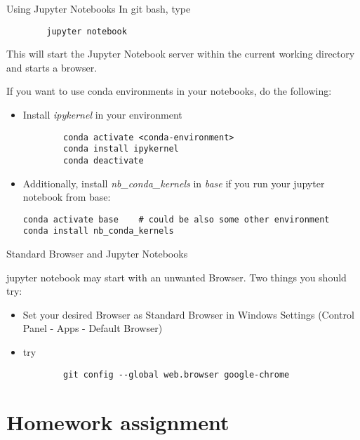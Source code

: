 \begin{frame}[fragile]{Using Jupyter Notebooks}
		In git bash, type
		\begin{verbatim}
		jupyter notebook
		\end{verbatim}
		This will start the Jupyter Notebook server within the current working directory and starts a browser.
		
		If you want to use conda environments in your notebooks, do the following:
		\begin{itemize}
			\item Install \textit{ipykernel} in your environment
		
		\begin{verbatim}
		conda activate <conda-environment>
		conda install ipykernel
		conda deactivate
		\end{verbatim}
		\item Additionally, install \textit{nb\_conda\_kernels} in \textit{base} if you run your jupyter notebook from base:
		\begin{verbatim}
conda activate base    # could be also some other environment
conda install nb_conda_kernels
		 \end{verbatim}
		\end{itemize}
		
\end{frame}

\begin{frame}[fragile]{Standard Browser and Jupyter Notebooks}
	
	jupyter notebook may start with an unwanted Browser. Two things you should try:
	\begin{itemize}
		\item Set your desired Browser as Standard Browser in Windows Settings (Control Panel - Apps - Default Browser)
		\item try
			\begin{verbatim}
		git config --global web.browser google-chrome	\end{verbatim}
		
	\end{itemize}
	
\end{frame}


\section{Homework assignment}


